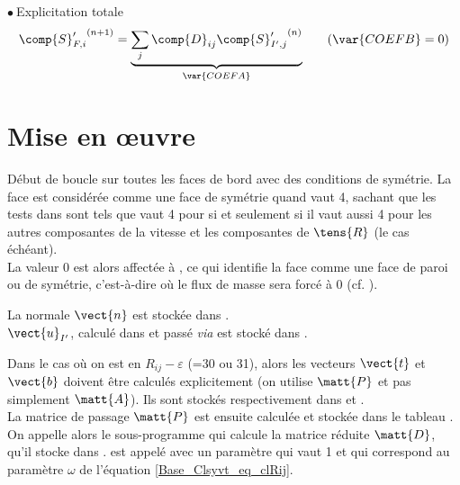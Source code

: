 $\bullet\ ${\sc Explicitation totale}\\
\begin{equation}
\label{Base_Clsyvt_eq_clRexp}
{\comp{S}_{F,i}^\prime}^{(n+1)} =
\underbrace{\sum_j\comp{D}_{ij}{\comp{S}_{I',j}^\prime}^{(n)}}_{\var{COEFA}}
\qquad(\var{COEFB}=0)
\end{equation}

\section{Mise en \oe uvre}
\label{Base_Clsyvt_prg_meo}%
D\'ebut de boucle sur toutes les faces de bord  avec des conditions de
sym\'etrie. La face est consid\'er\'ee comme une face de sym\'etrie quand
 vaut 4, sachant que les tests dans 
sont tels que  vaut 4 pour  si et seulement si il vaut aussi
4 pour les autres composantes de la vitesse et les composantes de $\tens{R}$ (le
cas \'ech\'eant).\\
La valeur 0 est alors affect\'ee \`a , ce qui identifie la face
comme une face de paroi ou de sym\'etrie, c'est-\`a-dire o\`u le flux de masse
sera forc\'e \`a 0 (cf. ).

La normale $\vect{n}$ est stock\'ee dans .\\
$\vect{u}_{I'}$, calcul\'e dans  et pass\'e {\em via} 
est stock\'e dans .

Dans le cas o\`u on est en $R_{ij}-\varepsilon$ (=30 ou 31),
alors les
vecteurs $\vect{t}$ et $\vect{b}$ doivent \^etre calcul\'es explicitement
(on utilise $\matt{P}$ et pas simplement $\matt{A}$).
Ils sont stock\'es respectivement dans  et
.\\
La matrice de passage $\matt{P}$ est ensuite calcul\'ee et stock\'ee dans le
tableau .\\
On appelle alors le sous-programme  qui calcule la matrice
r\'eduite $\matt{D}$, qu'il stocke dans .  est appel\'e
avec un param\`etre  qui vaut 1 et qui correspond au param\`etre
$\omega$ de l'\'equation \ref{Base_Clsyvt_eq_clRij}.


